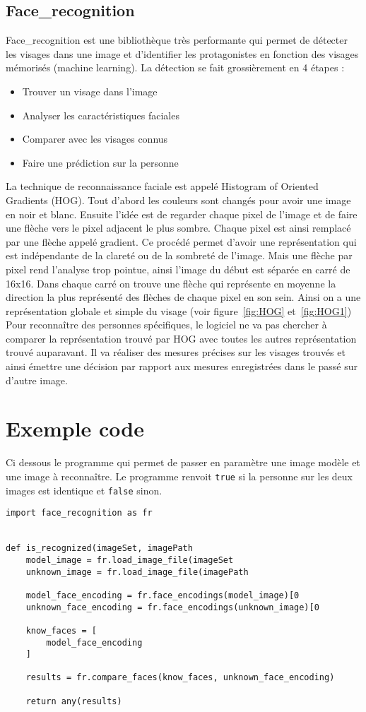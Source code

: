 \subsection{Face\_recognition}
Face\_recognition est une bibliothèque très performante qui permet de détecter
les visages dans une image et d'identifier les protagonistes en fonction des
visages mémorisés (machine learning). La détection se fait grossièrement en
4 étapes :
\begin{itemize}
  \item{Trouver un visage dans l'image}
  \item{Analyser les caractéristiques faciales}
  \item{Comparer avec les visages connus}
  \item{Faire une prédiction sur la personne}
\end{itemize}
\vspace{0.5cm}
La technique de reconnaissance faciale est appelé Histogram of Oriented Gradients
(HOG). Tout d'abord les couleurs sont changés pour avoir une image en noir et blanc.
Ensuite l'idée est de regarder chaque pixel de l'image et de faire une flèche vers
le pixel adjacent le plus sombre. Chaque pixel est ainsi remplacé par une flèche
appelé gradient. Ce procédé permet d'avoir une représentation qui est indépendante
de la clareté ou de la sombreté de l'image. Mais une flèche par pixel rend
l'analyse trop pointue, ainsi l'image du début est séparée en carré de 16x16.
Dans chaque carré on trouve une flèche qui représente en moyenne la direction
la plus représenté des flèches de chaque pixel en son sein. Ainsi on a une
représentation globale et simple du visage (voir figure~\ref{fig:HOG} et~\ref{fig:HOG1})
\\
Pour reconnaître des personnes spécifiques, le logiciel ne va pas chercher à
comparer la représentation trouvé par HOG avec toutes les autres représentation
trouvé auparavant. Il va réaliser des mesures précises sur les visages trouvés
et ainsi émettre une décision par rapport aux mesures enregistrées dans le passé
sur d'autre image.
\\
\newpage
\section{Exemple code}
Ci dessous le programme qui permet de passer en paramètre une image modèle et
une image à reconnaître. Le programme renvoit \verb|true| si la personne sur les deux
images est identique et \verb|false| sinon.
\\
\begin{verbatim}
import face_recognition as fr


def is_recognized(imageSet, imagePath
    model_image = fr.load_image_file(imageSet
    unknown_image = fr.load_image_file(imagePath

    model_face_encoding = fr.face_encodings(model_image)[0
    unknown_face_encoding = fr.face_encodings(unknown_image)[0

    know_faces = [
        model_face_encoding
    ]

    results = fr.compare_faces(know_faces, unknown_face_encoding)

    return any(results)
\end{verbatim}

